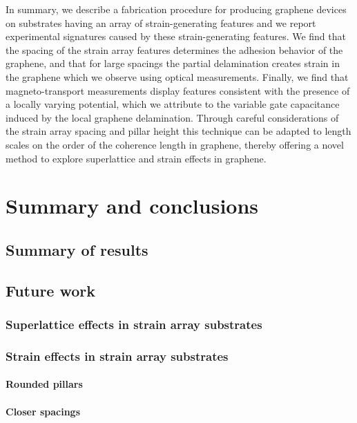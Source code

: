 \documentclass[edeposit,fullpage,draftthesis]{uiucthesis2009}
\begin{document}
            In summary, we describe a fabrication procedure for producing graphene devices on
            substrates having an array of strain-generating features and we report experimental signatures
            caused by these strain-generating features. We find that the spacing of the strain array features
            determines the adhesion behavior of the graphene, and that for large spacings the partial
            delamination creates strain in the graphene which we observe using optical measurements. 
            Finally, we find that magneto-transport measurements
            display features consistent with the presence of a locally varying potential, which we attribute to the 
            variable gate capacitance induced by the local graphene delamination. 
            Through careful considerations of the strain array spacing and pillar height
            this technique can be adapted to length scales on the order of the coherence length in
            graphene, thereby offering a novel method to explore superlattice and strain effects in graphene.
            


\chapter{Summary and conclusions}
\section{Summary of results}
\section{Future work}
\label{sec:fw}

    \subsection{Superlattice effects in strain array substrates}
    
    \subsection{Strain effects in strain array substrates}
        \subsubsection*{Rounded pillars}
        \subsubsection*{Closer spacings}
\end{document}
